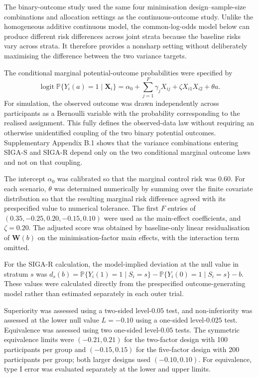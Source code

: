 \documentclass[12pt,a4paper]{article}
\theoremstyle{definition}
\theoremstyle{remark}\newtheorem{remark}{Remark}
\numberwithin{equation}{section}
\newcommand{\Pbb}{\mathbb P}
\begin{document}
The binary-outcome study used the same four minimisation design--sample-size combinations and allocation settings as the continuous-outcome study. Unlike the homogeneous additive continuous model, the common-log-odds model below can produce different risk differences across joint strata because the baseline risks vary across strata. It therefore provides a nonsharp setting without deliberately maximising the difference between the two variance targets.

The conditional marginal potential-outcome probabilities were specified by
\[
\operatorname{logit}\Pbb\{Y_i(a)=1\mid\bm X_i\}
=
\alpha_0
+
\sum_{j=1}^F\gamma_jX_{ij}
+
\zeta X_{i1}X_{i2}
+
\theta a.
\]
For simulation, the observed outcome was drawn independently across participants as a Bernoulli variable with the probability corresponding to the realised assignment. This fully defines the observed-data law without requiring an otherwise unidentified coupling of the two binary potential outcomes. Supplementary Appendix B.1 shows that the variance combinations entering SIGA-S and SIGA-R depend only on the two conditional marginal outcome laws and not on that coupling.

The intercept $\alpha_0$ was calibrated so that the marginal control risk was $0.60$. For each scenario, $\theta$ was determined numerically by summing over the finite covariate distribution so that the resulting marginal risk difference agreed with its prespecified value to numerical tolerance. The first $F$ entries of $(0.35,-0.25,0.20,-0.15,0.10)$ were used as the main-effect coefficients, and $\zeta=0.20$. The adjusted score was obtained by baseline-only linear residualisation of $\bm W(b)$ on the minimisation-factor main effects, with the interaction term omitted.

For the SIGA-R calculation, the model-implied deviation at the null value in stratum $s$ was $d_s(b)=\Pbb\{Y_i(1)=1\mid S_i=s\}-\Pbb\{Y_i(0)=1\mid S_i=s\}
-b$. These values were calculated directly from the prespecified outcome-generating model rather than estimated separately in each outer trial.

Superiority was assessed using a two-sided level-$0.05$ test, and non-inferiority was assessed at the lower null value $L=-0.10$ using a one-sided level-$0.025$ test. Equivalence was assessed using two one-sided level-$0.05$ tests. The symmetric equivalence limits were $(-0.21,0.21)$ for the two-factor design with 100 participants per group and $(-0.15,0.15)$ for the five-factor design with 200 participants per group; both larger designs used $(-0.10,0.10)$. For equivalence, type I error was evaluated separately at the lower and upper limits.
\end{document}
